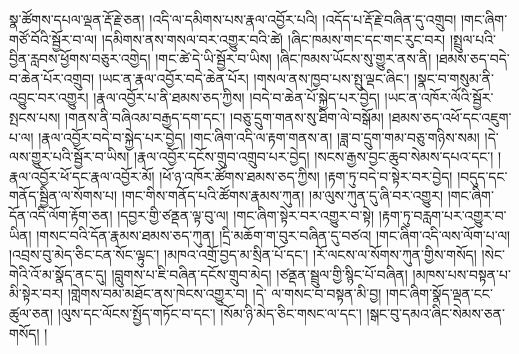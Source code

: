 སྣ་ཚོགས་དཔལ་ལྡན་རྡོ་རྗེ་ཅན། །འདི་ལ་དམིགས་པས་རྣལ་འབྱོར་པའི། །འདོད་པ་རྡོ་རྗེ་བཞིན་དུ་འགྲུབ། །གང་ཞིག་གཙོ་བོའི་སྦྱོར་བ་ལ། །དམིགས་ནས་གསལ་བར་འགྱུར་བའི་ཚེ། །ཞིང་ཁམས་གང་དང་གང་རུང་བར། །སྤྲུལ་པའི་བྱིན་རླབས་ཕྱོགས་བཅུར་འགྱེད། །གང་ཚེ་དེ་ཡི་སྦྱོར་བ་ཡིས། །ཞིང་ཁམས་ཡོངས་སུ་གྱུར་ནས་ནི། །ཐམས་ཅད་བདེ་བ་ཆེན་པོར་འགྲུབ། །ཡང་ན་རྣལ་འབྱོར་བདེ་ཆེན་པོར། །གསལ་ནས་ཁྱབ་པས་སྤུ་ལྡང་ཞིང་། །སྣང་བ་གསུམ་ནི་འབྱུང་བར་འགྱུར། །རྣལ་འབྱོར་པ་ནི་ཐམས་ཅད་ཀྱིས། །བདེ་བ་ཆེན་པོ་སྐྱེད་པར་བྱེད། །ཡང་ན་འཁོར་ལོའི་སྦྱོར་སྤངས་པས། །གནས་ནི་བཞིའམ་བརྒྱད་དག་དང་། །བཅུ་དྲུག་གནས་སུ་ཐིག་ལེ་བསྒོམ། །ཐམས་ཅད་འཕོ་དང་འཇུག་པ་ལ། །རྣལ་འབྱོར་བདེ་བ་སྐྱེད་པར་བྱེད། །གང་ཞིག་འདི་ལ་རྟག་གནས་ན། །ཟླ་བ་དྲུག་གམ་བཅུ་གཉིས་སམ། །དེ་ལས་གྱུར་པའི་སྦྱོར་བ་ཡིས། །རྣལ་འབྱོར་དངོས་གྲུབ་འགྲུབ་པར་བྱེད། །སངས་རྒྱས་བྱང་ཆུབ་སེམས་དཔའ་དང་། །རྣལ་འབྱོར་ཕོ་དང་རྣལ་འབྱོར་མོ། །ཕོ་ཉ་འཁོར་ཚོགས་ཐམས་ཅད་ཀྱིས། །རྟག་ཏུ་བདེ་བ་སྟེར་བར་བྱེད། །བདུད་དང་གནོད་སྦྱིན་ལ་སོགས་པ། །གང་གིས་གནོད་པའི་ཚོགས་རྣམས་ཀུན། །མ་ལུས་ཀུན་དུ་ཞི་བར་འགྱུར། །གང་ཞིག་དོན་འདི་ལོག་རྟོག་ཅན། །དབྱར་གྱི་ཙནྡན་ལྟ་བུ་ལ། །གང་ཞིག་སྟེར་བར་འགྱུར་བ་སྟེ། །རྟག་ཏུ་བརླག་པར་འགྱུར་བ་ཡིན། །གསང་བའི་དོན་རྣམས་ཐམས་ཅད་ཀུན། །དྲི་མཆོག་ག་བུར་བཞིན་དུ་བཙའ། །གང་ཞིག་འདི་ལས་ལོག་པ་ལ། །འབྲས་བུ་མེད་ཅིང་ངན་སོང་ལྟུང་། །མཁའ་འགྲོ་བྱད་མ་སྲིན་པོ་དང་། །རོ་ལངས་ལ་སོགས་ཀུན་གྱིས་གསོད། །སེང་གེའི་འོ་མ་སྣོད་ནང་དུ། །བླུགས་པ་ཇི་བཞིན་དངོས་གྲུབ་མེད། །ཙནྡན་སྦྲུལ་གྱི་སྙིང་པོ་བཞིན། །མཁས་པས་བསྟན་པ་མི་སྟེར་བར། །གླེགས་བམ་མཐོང་ནས་ཁེངས་འགྱུར་བ། །དེ་​ ལ་གསང་བ་བསྟན་མི་བྱ། །གང་ཞིག་སྣོད་ལྡན་ངང་ཚུལ་ཅན། །ལུས་དང་ལོངས་སྤྱོད་གཏོང་བ་དང་། །སོམ་ཉི་མེད་ཅིང་གསང་ལ་དང་། །སྒང་བུ་དམའ་ཞིང་སེམས་ཅན་གསོད། །
